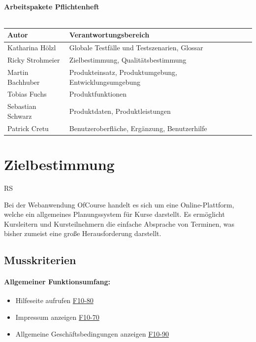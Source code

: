 \documentclass[a4paper]{scrreprt}
\begin{document}
\begin{titlepage}
\begin{center}
        \ \\
        \ \\
        \hspace{3 cm}\\
          \textbf{Arbeitspakete Pflichtenheft} \\
          \ \\
        
        \begin{tabular}{ | l | l |}
        	\hline
        	\textbf{Autor} & \textbf{Verantwortungsbereich} \\ \hline
        	 Katharina Hölzl & Globale Testfälle und Testszenarien, Glossar  \\ \hline
        	 Ricky Strohmeier& Zielbestimmung, Qualitätsbestimmung  \\ \hline
        	 Martin Bachhuber & Produkteinsatz, Produktumgebung, Entwicklungsumgebung  \\ \hline
	         Tobias Fuchs & Produktfunktionen \\ \hline
        	 Sebastian Schwarz & Produktdaten, Produktleistungen \\ \hline  
	         Patrick Cretu  &  Benutzeroberfläche, Ergänzung, Benutzerhilfe  \\ \hline
        \end{tabular}
    \end{center}
\end{titlepage}
 
 


\tableofcontents
 
\chapter{Zielbestimmung}
	\begin{tiny}
		RS
	\end{tiny}
	   Bei der Webanwendung OfCourse handelt es sich um eine Online-Plattform, welche ein allgemeines Planungssystem für Kurse darstellt. Es ermöglicht Kursleitern und Kursteilnehmern die einfache Absprache von Terminen, was bisher zumeist eine große Herausforderung darstellt.
    \section{Musskriterien}      
    	\subsubsection{Allgemeiner Funktionsumfang:}
      		\begin{itemize}
	      		\item Hilfeseite aufrufen \hyperlink{hilfeSeite}{F10-80}
	      		\item Impressum anzeigen \hyperlink{impressum}{F10-70}
	      		\item Allgemeine Geschäftsbedingungen anzeigen \hyperlink{agb}{F10-90}
      		\end{itemize}
\end{document}
